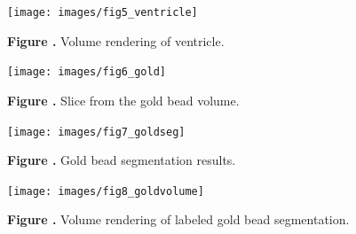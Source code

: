 \documentclass{frontiersMED} %
\begin{document}
\begin{figure}
\begin{center}
\texttt{[image: images/fig5\_ventricle]}
\end{center}
 \textbf{\label{fig:05} Figure .}{ Volume rendering of ventricle. }
\end{figure}

\begin{figure}
\begin{center}
\texttt{[image: images/fig6\_gold]}
\end{center}
 \textbf{\label{fig:06} Figure .}{ Slice from the gold bead volume. }
\end{figure}

\begin{figure}
\begin{center}
\texttt{[image: images/fig7\_goldseg]}
\end{center}
 \textbf{\label{fig:07} Figure .}{ Gold bead segmentation results. }
\end{figure}

\begin{figure}
\begin{center}
\texttt{[image: images/fig8\_goldvolume]}
\end{center}
 \textbf{\label{fig:08} Figure .}{ Volume rendering of labeled gold bead segmentation. }
\end{figure}




\end{document}

